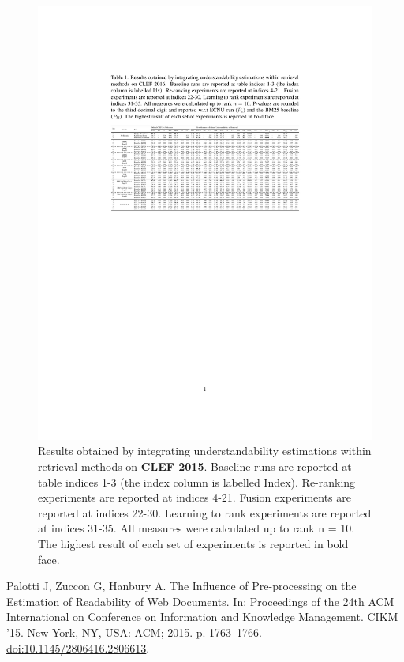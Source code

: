 \documentclass[10pt,a4paper]{article}
\begin{document}
\begin{figure}[h!]
	\centering
	\includegraphics[width=1.0\textwidth]{appendix/results_clef15}
    \caption{Results obtained by integrating understandability estimations within retrieval methods on \textbf{CLEF 2015}. Baseline runs
        are reported at table indices 1-3 (the index column is labelled Index). Re-ranking experiments are reported at indices 4-21. Fusion
        experiments are reported at indices 22-30. Learning to rank experiments are reported at indices 31-35. All measures were
        calculated up to rank n = 10. The highest result of each set of experiments is reported in bold face.}
	\label{fig:dist}
\end{figure}


\begin{thebibliography}{1}
	
	Palotti J, Zuccon G, Hanbury A.
	\newblock The Influence of Pre-processing on the Estimation of Readability of
	Web Documents.
	\newblock In: Proceedings of the 24th ACM International on Conference on
	Information and Knowledge Management. CIKM '15. New York, NY, USA: ACM; 2015.
	p. 1763--1766.
	\newblock \href {http://dx.doi.org/10.1145/2806416.2806613}
	{doi:10.1145/2806416.2806613}.
	
\end{thebibliography}
\end{document}
